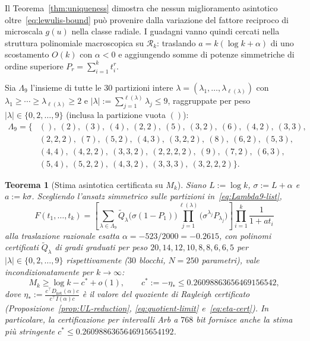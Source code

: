 \documentclass[11pt, reqno]{amsart}
\newtheorem{theorem}{Teorema}
\theoremstyle{remark}
\numberwithin{equation}{section}
\newcommand{\cR}{\mathcal{R}}
\begin{document}
Il Teorema~\ref{thm:uniqueness} dimostra che nessun miglioramento asintotico oltre~\eqref{eq:lewulis-bound}
può provenire dalla variazione del fattore reciproco di microscala $g(u)$ nella classe radiale.
I guadagni vanno quindi cercati nella struttura polinomiale macroscopica su $\cR_k$: traslando
$a = k(\log k + \alpha)$ di uno scostamento $O(k)$ con $\alpha < 0$ e aggiungendo somme di potenze
simmetriche di ordine superiore $P_r = \sum_{i=1}^k t_i^r$.

Sia $\Lambda_9$ l'insieme di tutte le $30$ partizioni intere
$\lambda = (\lambda_1, \dots, \lambda_{\ell(\lambda)})$ con
$\lambda_1 \ge \cdots \ge \lambda_{\ell(\lambda)} \ge 2$ e $|\lambda| := \sum_{j=1}^{\ell(\lambda)} \lambda_j \le 9$,
raggruppate per peso $|\lambda| \in \{0, 2, \dots, 9\}$ (inclusa la partizione vuota $()$):
\begin{equation}\label{eq:Lambda9-list}
\begin{aligned}
\Lambda_9 = \bigl\{ &(),\ (2),\ (3),\ (4),\ (2,2),\ (5),\ (3,2),\ (6),\ (4,2),\ (3,3),\\
&(2,2,2),\ (7),\ (5,2),\ (4,3),\ (3,2,2),\ (8),\ (6,2),\ (5,3),\\
&(4,4),\ (4,2,2),\ (3,3,2),\ (2,2,2,2),\ (9),\ (7,2),\ (6,3),\\
&(5,4),\ (5,2,2),\ (4,3,2),\ (3,3,3),\ (3,2,2,2)\bigr\}.
\end{aligned}
\end{equation}

\begin{theorem}[Stima asintotica certificata su $M_k$]\label{thm:main}
Siano $L := \log k$, $\sigma := L + \alpha$ e $a := k\sigma$. Scegliendo l'ansatz simmetrico
sulle partizioni in~\eqref{eq:Lambda9-list},
\begin{equation}\label{eq:ansatz-C}
F(t_1,\dots,t_k) = \left[ \sum_{\lambda \in \Lambda_9}
\widetilde{Q}_\lambda\bigl(\sigma(1-P_1)\bigr)
\prod_{j=1}^{\ell(\lambda)} \bigl(\sigma^{\lambda_j} P_{\lambda_j}\bigr) \right]
\prod_{i=1}^k \frac{1}{1 + a t_i}
\end{equation}
alla traslazione razionale esatta $\alpha = -523/2000 = -0.2615$, con polinomi certificati
$\widetilde{Q}_\lambda$ di gradi graduati per peso $20, 14, 12, 10, 8, 8, 6, 6, 5$ per
$|\lambda| \in \{0, 2, \dots, 9\}$ rispettivamente ($30$ blocchi, $N = 250$ parametri), vale
incondizionatamente per $k \to \infty$:
\begin{equation}\label{eq:main-bound}
M_k \ge \log k - c^* + o(1), \qquad c^* := -\eta_* \le 0.26098863656469156542,
\end{equation}
dove $\eta_* := \frac{c^\top D_{\mathrm{net}}(\alpha) c}{c^\top I(\alpha) c}$ è il valore del quoziente di
Rayleigh certificato (Proposizione~\ref{prop:UL-reduction}, \eqref{eq:quotient-limit} e~\eqref{eq:eta-cert}). In particolare,
la certificazione per intervalli Arb a $768$ bit fornisce anche la stima più stringente
$c^* \le 0.2609886365646915654192$.
\end{theorem}
\end{document}
